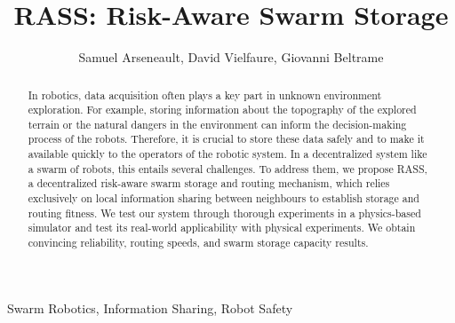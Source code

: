 \documentclass[letterpaper, 10 pt, conference]{ieeeconf}
\title{\LARGE \bf RASS: Risk-Aware Swarm Storage}
\author{Samuel Arseneault, David Vielfaure, Giovanni Beltrame}
\begin{document}
\maketitle

\begin{abstract}
In robotics, data acquisition often plays a key part in
unknown environment exploration. For example, storing information about the topography of the explored terrain or the natural dangers in the environment can
inform the decision-making process of the robots. 
Therefore, it is crucial to store these data safely
and to make it available quickly to the operators of the robotic
system. In a decentralized system like a swarm of robots, this
entails several challenges. To address them, we propose RASS, a
decentralized risk-aware swarm storage and routing mechanism,
which relies exclusively on local information sharing between neighbours to establish
storage and routing fitness. We test our system through thorough experiments in a physics-based simulator and test its real-world applicability with physical experiments. We obtain convincing reliability, routing speeds, and swarm storage capacity results.
\end{abstract}

\begin{keywords}
Swarm Robotics, Information Sharing, Robot Safety
\end{keywords}
\end{document}
